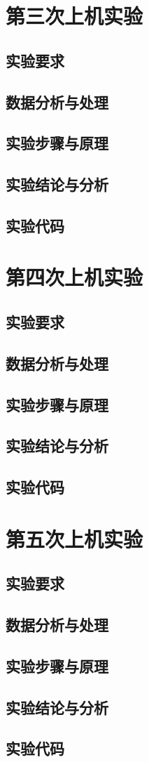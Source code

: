 \documentclass[a4paper,12pt]{report}
\begin{document}
\chapter{第三次上机实验}
\section{实验要求}
\section{数据分析与处理}
\section{实验步骤与原理}
\section{实验结论与分析}
\section{实验代码}
\clearpage
\chapter{第四次上机实验}
\section{实验要求}
\section{数据分析与处理}
\section{实验步骤与原理}
\section{实验结论与分析}
\section{实验代码}
\clearpage
\chapter{第五次上机实验}
\section{实验要求}
\section{数据分析与处理}
\section{实验步骤与原理}
\section{实验结论与分析}
\section{实验代码}
\printbibliography
\end{document}
